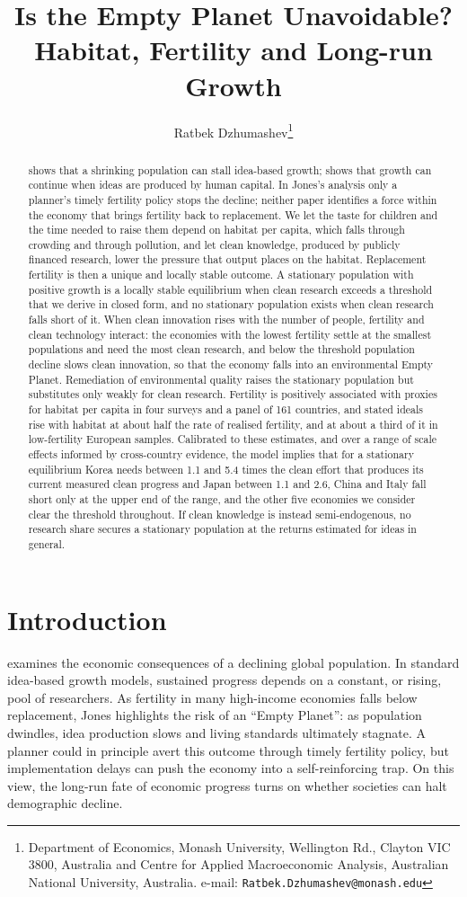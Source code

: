 \documentclass[11pt]{article}
\title{Is the Empty Planet Unavoidable? \\
Habitat, Fertility and Long-run Growth}%
\author{Ratbek Dzhumashev\thanks{Department of Economics, Monash University, Wellington Rd., Clayton VIC 3800, Australia and Centre for Applied Macroeconomic Analysis, Australian National University, Australia.           e-mail: \texttt{Ratbek.Dzhumashev@monash.edu}} 	
}
\date{}
\begin{document}
\maketitle
\begin{abstract}
\noindent
\citet{jones22} shows that a shrinking population can stall idea-based growth; \citet{STRULIK2024104943}
shows that growth can continue when ideas are produced by human capital. In Jones's analysis only a
planner's timely fertility policy stops the decline; neither paper identifies a force within the economy
that brings fertility back to replacement. We let the taste for children and the time needed to raise them depend
on habitat per capita, which falls through crowding and through pollution, and let clean knowledge,
produced by publicly financed research, lower the pressure that output places on the habitat.
Replacement fertility is then a unique and locally stable outcome. A stationary population with
positive growth is a locally stable equilibrium when clean research exceeds a threshold that we derive
in closed form, and no stationary population exists when clean research falls short of it. When clean innovation rises with the number of people, fertility and clean technology
interact: the economies with the lowest fertility settle at the smallest populations and need the most
clean research, and below the threshold population decline slows clean innovation, so that the economy
falls into an environmental Empty Planet. Remediation of environmental quality raises the stationary population but substitutes only weakly
for clean research. Fertility is positively associated with proxies for habitat per capita in four
surveys and a panel of 161 countries, and stated ideals rise with habitat at about half the rate of
realised fertility, and at about a third of it in low-fertility European samples. Calibrated to these estimates, and over a range of scale effects informed by
cross-country evidence, the model implies that for a stationary equilibrium Korea needs between 1.1 and
5.4 times the clean effort that produces its current measured clean progress and Japan between 1.1 and
2.6, China and Italy fall short only at the upper end of the range, and the other five economies we
consider clear the threshold throughout. If clean knowledge is instead semi-endogenous, no research share
secures a stationary population at the returns estimated for ideas in general.
\end{abstract}
\onehalfspacing
\section{Introduction}
\citet{jones22} examines the economic consequences of a declining global population. In standard
idea-based growth models, sustained progress depends on a constant, or rising, pool of researchers.
As fertility in many high-income economies falls below replacement, Jones highlights the risk of an
``Empty Planet'': as population dwindles, idea production slows and living standards ultimately
stagnate. A planner could in principle avert this outcome through timely fertility policy, but
implementation delays can push the economy into a self-reinforcing trap. On this view, the long-run
fate of economic progress turns on whether societies can halt demographic decline.
\end{document}
